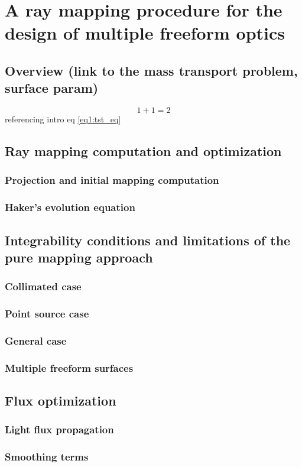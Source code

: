 \chapter{A ray mapping procedure for the design of multiple freeform optics}
\label{ch:core}

\section{Overview (link to the mass transport problem, surface param)}
\begin{equation}
\label{eq3:tst_eq}
1+1=2
\end{equation}
referencing intro eq \eqref{eq1:tst_eq}

\section{Ray mapping computation and optimization}
\subsection{Projection and initial mapping computation}

\subsection{Haker's evolution equation}

\section{Integrability conditions and limitations of the pure mapping approach}
\subsection{Collimated case}
\subsection{Point source case}
\subsection{General case}
\subsection{Multiple freeform surfaces}

\section{Flux optimization}
\subsection{Light flux propagation}
\subsection{Smoothing terms}


